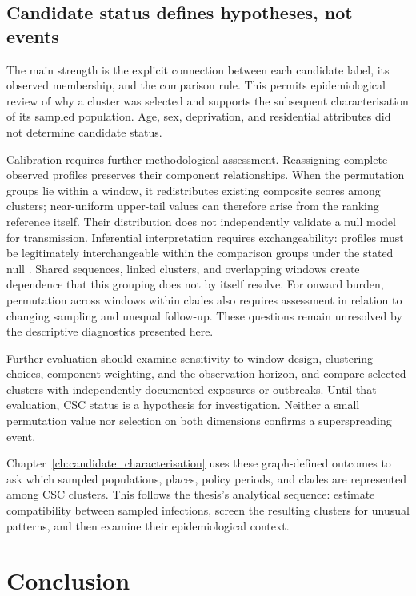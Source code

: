 \subsection{Candidate status defines hypotheses, not events}\label{sec:ch5_strengths_limitations}

The main strength is the explicit connection between each candidate label, its observed membership, and the comparison rule. This permits epidemiological review of why a cluster was selected and supports the subsequent characterisation of its sampled population. Age, sex, deprivation, and residential attributes did not determine candidate status.

Calibration requires further methodological assessment. Reassigning complete observed profiles preserves their component relationships. When the permutation groups lie within a window, it redistributes existing composite scores among clusters; near-uniform upper-tail values can therefore arise from the ranking reference itself. Their distribution does not independently validate a null model for transmission. Inferential interpretation requires exchangeability: profiles must be legitimately interchangeable within the comparison groups under the stated null \citep{Hemerik2017}. Shared sequences, linked clusters, and overlapping windows create dependence that this grouping does not by itself resolve. For onward burden, permutation across windows within clades also requires assessment in relation to changing sampling and unequal follow-up. These questions remain unresolved by the descriptive diagnostics presented here.

Further evaluation should examine sensitivity to window design, clustering choices, component weighting, and the observation horizon, and compare selected clusters with independently documented exposures or outbreaks. Until that evaluation, CSC status is a hypothesis for investigation. Neither a small permutation value nor selection on both dimensions confirms a superspreading event.

Chapter~\ref{ch:candidate_characterisation} uses these graph-defined outcomes to ask which sampled populations, places, policy periods, and clades are represented among CSC clusters. This follows the thesis's analytical sequence: estimate compatibility between sampled infections, screen the resulting clusters for unusual patterns, and then examine their epidemiological context.

\section{Conclusion}\label{sec:ch5_discussion_conclusions}

